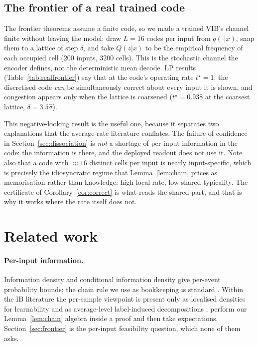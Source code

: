 \documentclass[11pt]{article}
\begin{document}
\subsection{The frontier of a real trained code}
\label{sec:realfrontier}
The frontier theorems assume a finite code, so we made a trained VIB's channel finite without
leaving the model: draw $L=16$ codes per input from $q(\cdot|x)$, snap them to a lattice of step
$\delta$, and take $Q(z|x)$ to be the empirical frequency of each occupied cell ($200$ inputs,
$3200$ cells). This is the stochastic channel the encoder defines, not the deterministic mean
decode. LP results (Table~\ref{tab:realfrontier}) say that at the code's operating rate
$t^\star=1$: the discretised code \emph{can} be simultaneously correct about every input it is
shown, and congestion appears only when the lattice is coarsened
($t^\star=0.938$ at the coarsest lattice, $\delta=3.5\hat\sigma$).

\begin{table}[t]\centering\small
\caption{Achievable uniform guarantee $t^\star$ of a discretised real VIB code (FashionMNIST,
$200$ inputs, $16$ sampled codes each, LP over cell-to-label assignments with the aggregate
accuracy constrained at the deployed level).}
\label{tab:realfrontier}

\end{table}

This negative-looking result is the useful one, because it separates two explanations that the
average-rate literature conflates. The failure of confidence in Section~\ref{sec:dissociation} is
\emph{not} a shortage of per-input information in the code: the information is there, and the
deployed readout does not use it. Note also that a code with $\approx16$ distinct cells per input
is nearly input-specific, which is precisely the idiosyncratic regime that Lemma~\ref{lem:chain}
prices as memorisation rather than knowledge: high local rate, low shared typicality. The
certificate of Corollary~\ref{cor:correct} is what reads the shared part, and that is why it
works where the rate itself does not.

\section{Related work}
\paragraph{Per-input information.} Information density and conditional information density
\citep{hellstrom2021,verdu2012} give per-event probability bounds; the chain rule we use as
bookkeeping is standard \citep{verdu2012,hellstrom2021}. Within the IB literature the per-sample
viewpoint is present only as localised densities for learnability \citep{wu2019} and as
average-level label-induced decompositions \citep{structured2026,sourcesuff2024};
\citet{structured2026} perform our Lemma~\ref{lem:chain} algebra inside a proof and then take
expectations. Section~\ref{sec:frontier} is the per-input feasibility question, which none of
them asks.
\end{document}
